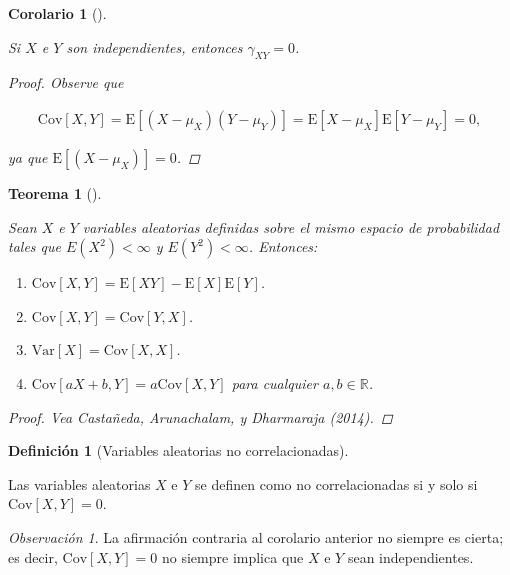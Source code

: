 \documentclass[
  us-letterpaper,
]{scrreprt}
\theoremstyle{plain}
\newtheorem{corollary}{Corolario}[chapter]
\theoremstyle{definition}
\newtheorem{definition}{Definición}[chapter]
\theoremstyle{definition}
\theoremstyle{plain}
\newtheorem{theorem}{Teorema}[chapter]
\theoremstyle{remark}
\newtheorem*{remark}{Observación}
\begin{document}
\begin{corollary}[]\protect\hypertarget{cor-covind}{}\label{cor-covind}

Si \(X\) e \(Y\) son independientes, entonces \(\gamma_{XY}=0\).

\begin{proof}
Observe que

\[ \begin{split}\mathrm{Cov}[X,Y]=\mathrm E[(X-\mu_X)(Y-\mu_Y)]=\mathrm E[X-\mu_X]\mathrm E[Y-\mu_Y]=0,\end{split} \]

ya que \(\mathrm E[(X-\mu_X)]=0\).
\end{proof}

\end{corollary}

\begin{theorem}[]\protect\hypertarget{thm-propiedades}{}\label{thm-propiedades}

Sean \(X\) e \(Y\) variables aleatorias definidas sobre el mismo espacio
de probabilidad tales que \(E(X^2) < \infty\) y \(E(Y^2) < \infty\).
Entonces:

\begin{enumerate}
\def\labelenumi{\roman{enumi}.}
\item
  \(\mathrm{Cov}[X, Y]= \mathrm{E}[XY]-\mathrm{E}[X]\mathrm{E}[Y]\).
\item
  \(\mathrm{Cov}[X, Y]= \mathrm{Cov}[Y,X]\).
\item
  \(\mathrm{Var}[X]= \mathrm{Cov}[X,X]\).
\item
  \(\mathrm{Cov}[aX+b, Y]= a\mathrm{Cov}[X, Y]\) para cualquier
  \(a,b \in\mathbb{R}\).
\end{enumerate}

\begin{proof}
Vea Castañeda, Arunachalam, y Dharmaraja (2014).
\end{proof}

\end{theorem}

\begin{definition}[Variables aleatorias no
correlacionadas]\protect\hypertarget{def-uncorr}{}\label{def-uncorr}

Las variables aleatorias \(X\) e \(Y\) se definen como no
correlacionadas si y solo si \(\mathrm{Cov}[X,Y]=0\).

\end{definition}

\begin{remark}
La afirmación contraria al corolario anterior no siempre es cierta; es
decir, \(\mathrm{Cov}[X,Y]=0\) no siempre implica que \(X\) e \(Y\) sean
independientes.
\end{remark}
\end{document}
